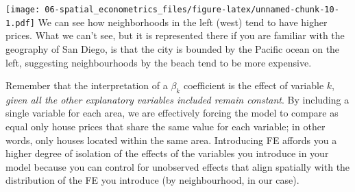 \documentclass[
]{book}
\newenvironment{Shaded}{\begin{snugshade}}{\end{snugshade}}
\newcommand{\CommentTok}[1]{\textcolor[rgb]{0.56,0.35,0.01}{\textit{#1}}}
\newcommand{\DataTypeTok}[1]{\textcolor[rgb]{0.13,0.29,0.53}{#1}}
\newcommand{\KeywordTok}[1]{\textcolor[rgb]{0.13,0.29,0.53}{\textbf{#1}}}
\newcommand{\NormalTok}[1]{#1}
\newcommand{\OperatorTok}[1]{\textcolor[rgb]{0.81,0.36,0.00}{\textbf{#1}}}
\newcommand{\StringTok}[1]{\textcolor[rgb]{0.31,0.60,0.02}{#1}}
\begin{document}
\begin{Shaded}
\end{Shaded}

\texttt{[image: 06-spatial\_econometrics\_files/figure-latex/unnamed-chunk-10-1.pdf]}
We can see how neighborhoods in the left (west) tend to have higher prices. What we can't see, but it is represented there if you are familiar with the geography of San Diego, is that the city is bounded by the Pacific ocean on the left, suggesting neighbourhoods by the beach tend to be more expensive.

Remember that the interpretation of a \(\beta_k\) coefficient is the effect of variable \(k\), \emph{given all the other explanatory variables included remain constant}. By including a single variable for each area, we are effectively forcing the model to compare as equal only house prices that share the same value for each variable; in other words, only houses located within the same area. Introducing FE affords you a higher degree of isolation of the effects of the variables you introduce in your model because you can control for unobserved effects that align spatially with the distribution of the FE you introduce (by neighbourhood, in our case).
\end{document}

